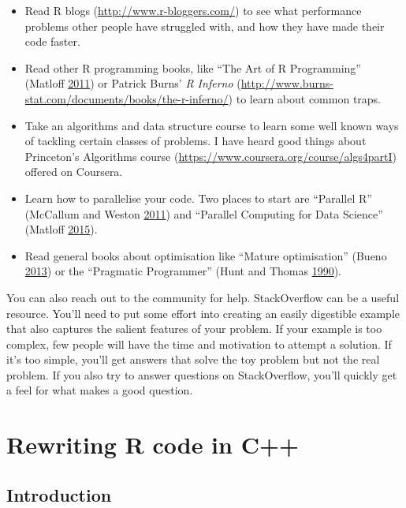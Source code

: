 \documentclass[]{book}
\renewcommand{\href}[2]{#2 (\url{#1})}
\begin{document}
\begin{itemize}
\item
  \href{http://www.r-bloggers.com/}{Read R blogs} to see what performance
  problems other people have struggled with, and how they have made their
  code faster.
\item
  Read other R programming books, like ``The Art of R Programming''
  (Matloff \protect\hyperlink{ref-art-r-prog}{2011}) or Patrick Burns'
  \href{http://www.burns-stat.com/documents/books/the-r-inferno/}{\emph{R Inferno}} to
  learn about common traps.
\item
  Take an algorithms and data structure course to learn some
  well known ways of tackling certain classes of problems. I have heard
  good things about Princeton's
  \href{https://www.coursera.org/course/algs4partI}{Algorithms course} offered on
  Coursera.
\item
  Learn how to parallelise your code. Two places to start are
  ``Parallel R'' (McCallum and Weston \protect\hyperlink{ref-parallel-r}{2011}) and ``Parallel Computing for Data Science''
  (Matloff \protect\hyperlink{ref-parcomp-ds}{2015}).
\item
  Read general books about optimisation like ``Mature optimisation'' (Bueno \protect\hyperlink{ref-mature-opt}{2013})
  or the ``Pragmatic Programmer'' (Hunt and Thomas \protect\hyperlink{ref-pragprog}{1990}).
\end{itemize}

You can also reach out to the community for help. StackOverflow can be a useful resource. You'll need to put some effort into creating an easily digestible example that also captures the salient features of your problem. If your example is too complex, few people will have the time and motivation to attempt a solution. If it's too simple, you'll get answers that solve the toy problem but not the real problem. If you also try to answer questions on StackOverflow, you'll quickly get a feel for what makes a good question.

\hypertarget{rcpp}{%
\chapter{Rewriting R code in C++}\label{rcpp}}

\hypertarget{introduction-8}{%
\section{Introduction}\label{introduction-8}}
\end{document}
